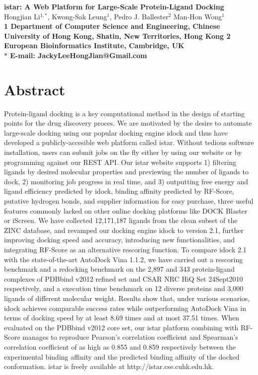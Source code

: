 \documentclass[10pt]{article}
\date{}
\begin{document}
\begin{flushleft}
{\Large
\textbf{istar: A Web Platform for Large-Scale Protein-Ligand Docking}
}
\\
Hongjian Li$^{1,\ast}$, 
Kwong-Sak Leung$^{1}$, 
Pedro J. Ballester$^{2}$
Man-Hon Wong$^{1}$
\\
\bf{1} Department of Computer Science and Engineering, Chinese University of Hong Kong, Shatin, New Territories, Hong Kong
\bf{2} European Bioinformatics Institute, Cambridge, UK
\\
$\ast$ E-mail: JackyLeeHongJian@Gmail.com
\end{flushleft}

\section*{Abstract}
Protein-ligand docking is a key computational method in the design of starting points for the drug discovery proces. We are motivated by the desire to automate large-scale docking using our popular docking engine idock and thus have developed a publicly-accesible web platform called istar. Without tedious software installation, users can submit jobs on the fly either by using our website or by programming against our REST API. Our istar website supports 1) filtering ligands by desired molecular properties and previewing the number of ligands to dock, 2) monitoring job progress in real time, and 3) outputting free energy and ligand efficiency predicted by idock, binding affinity predicted by RF-Score, putative hydrogen bonds, and supplier information for easy purchase, three useful features commonly lacked on other online docking platforms like DOCK Blaster or iScreen. We have collected 12,171,187 ligands from the clean subset of the ZINC database, and revamped our docking engine idock to version 2.1, further improving docking speed and accuracy, introducing new functionalities, and integrating RF-Score as an alternative rescoring function. To compare idock 2.1 with the state-of-the-art AutoDock Vina 1.1.2, we have carried out a rescoring benchmark and a redocking benchmark on the 2,897 and 343 protein-ligand complexes of PDBbind v2012 refined set and CSAR NRC HiQ Set 24Sept2010 respectively, and a execution time benchmark on 12 diverse proteins and 3,000 ligands of different molecular weight. Results show that, under various scenarios, idock achieves comparable success rates while outperforming AutoDock Vina in terms of docking speed by at least 8.69 times and at most 37.51 times. When evaluated on the PDBbind v2012 core set, our istar platform combining with RF-Score manages to reproduce Pearson's correlation coefficient and Spearman's correlation coefficient of as high as 0.855 and 0.859 respectively between the experimental binding affinity and the predicted binding affinity of the docked conformation. istar is freely available at http://istar.cse.cuhk.edu.hk.
\end{document}
